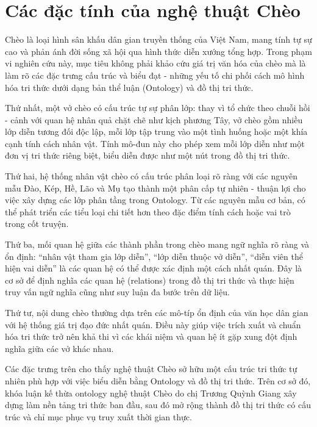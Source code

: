 
\section{Các đặc tính của nghệ thuật Chèo}

Chèo là loại hình sân khấu dân gian truyền thống của Việt Nam, mang tính tự sự cao và phản ánh đời sống xã hội qua hình thức diễn xướng tổng hợp. Trong phạm vi nghiên cứu này, mục tiêu không phải khảo cứu giá trị văn hóa của chèo mà là làm rõ các đặc trưng cấu trúc và biểu đạt - những yếu tố chi phối cách mô hình hóa tri thức dưới dạng bản thể luận (Ontology) và đồ thị tri thức.

Thứ nhất, một vở chèo có cấu trúc tự sự phân lớp: thay vì tổ chức theo chuỗi hồi - cảnh với quan hệ nhân quả chặt chẽ như kịch phương Tây, vở chèo gồm nhiều lớp diễn tương đối độc lập, mỗi lớp tập trung vào một tình huống hoặc một khía cạnh tính cách nhân vật. Tính mô-đun này cho phép xem mỗi lớp diễn như một đơn vị tri thức riêng biệt, biểu diễn được như một nút trong đồ thị tri thức.

Thứ hai, hệ thống nhân vật chèo có cấu trúc phân loại rõ ràng với các nguyên mẫu Đào, Kép, Hề, Lão và Mụ tạo thành một phân cấp tự nhiên - thuận lợi cho việc xây dựng các lớp phân tầng trong Ontology. Từ các nguyên mẫu cơ bản, có thể phát triển các tiểu loại chi tiết hơn theo đặc điểm tính cách hoặc vai trò trong cốt truyện.

Thứ ba, mối quan hệ giữa các thành phần trong chèo mang ngữ nghĩa rõ ràng và ổn định: ``nhân vật tham gia lớp diễn'', ``lớp diễn thuộc vở diễn'', ``diễn viên thể hiện vai diễn'' là các quan hệ có thể được xác định một cách nhất quán. Đây là cơ sở để định nghĩa các quan hệ (relations) trong đồ thị tri thức và thực hiện truy vấn ngữ nghĩa cũng như suy luận đa bước trên dữ liệu.

Thứ tư, nội dung chèo thường dựa trên các mô-típ ổn định của văn học dân gian với hệ thống giá trị đạo đức nhất quán. Điều này giúp việc trích xuất và chuẩn hóa tri thức trở nên khả thi vì các khái niệm và quan hệ ít gặp xung đột định nghĩa giữa các vở khác nhau.

Các đặc trưng trên cho thấy nghệ thuật Chèo sở hữu một cấu trúc tri thức tự nhiên phù hợp với việc biểu diễn bằng Ontology và đồ thị tri thức. Trên cơ sở đó, khóa luận kế thừa ontology nghệ thuật Chèo do chị Trương Quỳnh Giang xây dựng làm nền tảng tri thức ban đầu, sau đó mở rộng thành đồ thị tri thức có cấu trúc và chỉ mục phục vụ truy xuất thời gian thực.
